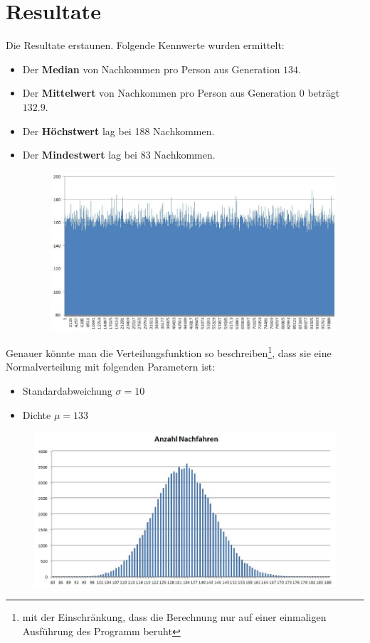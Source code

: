 \documentclass[a4paper,10pt,headlines=3.2]{scrartcl}
\newcommand*\f[1] {\textbf{#1}}
\begin{document}
\section{Resultate}
Die Resultate erstaunen. Folgende Kennwerte wurden ermittelt:
\begin{itemize}
 \item Der \f{Median} von Nachkommen pro Person aus Generation $134$.
 \item Der \f{Mittelwert} von Nachkommen pro Person aus Generation $0$ beträgt $132.9$.
 \item Der \f{Höchstwert} lag bei 188 Nachkommen.
 \item Der \f{Mindestwert} lag bei 83 Nachkommen.

\begin{figure}[ht]
\centering
\includegraphics[width=0.9\linewidth]{sample1}
\end{figure}

\end{itemize}
Genauer könnte man die Verteilungsfunktion so beschreiben\footnote{mit der Einschränkung, dass die Berechnung nur auf einer einmaligen Ausführung des Programm beruht}, dass sie eine Normalverteilung mit folgenden Parametern ist:
\begin{itemize}
 \item Standardabweichung $\sigma = 10$
 \item Dichte $\mu = 133$
\end{itemize}

\begin{figure}[ht]
\centering
\includegraphics[width=0.9\linewidth]{sample2}
\end{figure}
\end{document}

